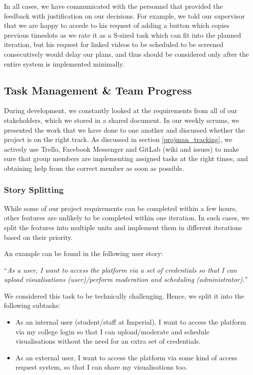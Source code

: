\documentclass[a4paper, titlepage]{article}
\begin{document}
In all cases, we have communicated with the personnel that provided the
feedback with justification on our decisions. For example, we told
our supervisor that we are happy to accede to his request of adding a button which copies previous timeslots as we rate it as a S-sized task which can fit into the planned iteration, but his request for linked videos to be scheduled to be screened consecutively would delay our plans, and thus should be considered only after the entire system is implemented minimally.


\subsection{Task Management \& Team Progress}
During development, we constantly looked at the requirements from all of our stakeholders, which we stored in a shared document. In our weekly scrums, we presented the work that we have done to one another and discussed whether the project is on the right track. As discussed in section \ref{projman_tracking}, we actively use Trello, Facebook Messenger and GitLab (wiki and issues) to make sure that group members are implementing assigned tasks at the right times, and obtaining help from the correct member as soon as possible.

\subsubsection{Story Splitting}

While some of our project requirements can be completed within a few hours, other features are unlikely to be completed within one iteration. In such cases, we split the features into multiple units and implement them in different iterations based on their priority.

An example can be found in the following user story:
\begin{center}
``\textit{As a user, I want to access the platform via a set of credentials so that I can upload visualisations (user)/perform moderation and scheduling (administrator).}'' \\
\end{center}

We considered this task to be technically challenging. Hence, we split it into the following subtasks:

\begin{itemize}

  \item As an internal user (student/staff at Imperial), I want to access the platform via my college login so that I can upload/moderate and schedule visualisations without the need for an extra set of credentials.

  \item As an external user, I want to access the platform via some kind of access request system, so that I can share my visualisations too.

\end{itemize}
\end{document}
